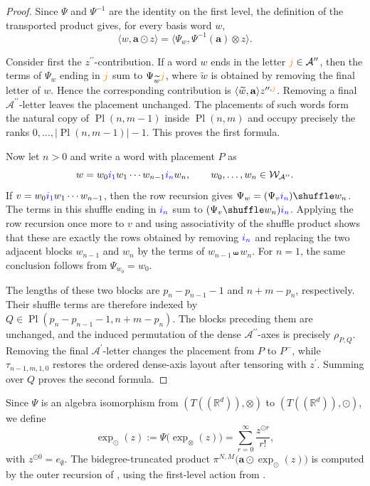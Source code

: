 \documentclass{amsart}
\theoremstyle{definition}
\theoremstyle{remark}
\newcommand{\blue}[1]{{\color{blue}#1}}
\newcommand{\orange}[1]{{\color{orange}#1}}
\begin{document}
\begin{proof}
Since $\Psi$ and $\Psi^{-1}$ are the identity on the first level, the
definition of the transported product gives, for every basis word $w$,
\[
    \big\langle
        w,
        \mathbf{a}\odot z
    \big\rangle
    =
    \big\langle
        \Psi_w,
        \Psi^{-1}(\mathbf{a})\otimes z
    \big\rangle.
\]

Consider first the $z^{\prime\prime}$-contribution. If a word $w$ ends in
the letter $\orange{j}\in\mathcal{A}^{\prime\prime}$, then the terms of
$\Psi_w$ ending in $\orange{j}$ sum to
$\Psi_{\widetilde{w}}\orange{j}$, where $\widetilde{w}$ is obtained by
removing the final letter of $w$. Hence the corresponding contribution is
$\langle\widetilde{w},\mathbf{a}\rangle
z^{\prime\prime,\orange{j}}$. Removing a final
$\mathcal{A}^{\prime\prime}$-letter leaves the placement unchanged. The
placements of such words form the natural copy of
$\operatorname{Pl}(n,m-1)$ inside $\operatorname{Pl}(n,m)$ and occupy
precisely the ranks
$0,\ldots,|\operatorname{Pl}(n,m-1)|-1$. This proves the first formula.

Now let $n>0$ and write a word with placement $P$ as
\[
    w
    =
    w_0\blue{i_1}w_1
    \cdots
    w_{n-1}\blue{i_n}w_n,
    \qquad
    w_0,\ldots,w_n
    \in
    \mathcal{W}_{\mathcal{A}^{\prime\prime}}.
\]
If
$v=w_0\blue{i_1}w_1\cdots
w_{n-1}$, then the row recursion gives
$\Psi_w=(\Psi_v\blue{i_n})\shuffle w_n$. The terms in this shuffle ending
in $\blue{i_n}$ sum to
$(\Psi_v\shuffle w_n)\blue{i_n}$. Applying the row recursion once more to
$v$ and using associativity of the shuffle product shows that these are
exactly the rows obtained by removing $\blue{i_n}$ and replacing the two
adjacent blocks $w_{n-1}$ and $w_n$ by the terms of
$w_{n-1}\shuffle w_n$. For $n=1$, the same conclusion follows from
$\Psi_{w_0}=w_0$.

The lengths of these two blocks are
$p_n-p_{n-1}-1$ and $n+m-p_n$, respectively. Their shuffle terms are
therefore indexed by
$Q\in
\operatorname{Pl}
\left(
    p_n-p_{n-1}-1,
    n+m-p_n
\right)$.
The blocks preceding them are unchanged, and the induced permutation of
the dense $\mathcal{A}^{\prime\prime}$-axes is precisely
$\rho_{P,Q}$. Removing the final
$\mathcal{A}^{\prime}$-letter changes the placement from $P$ to $P^{-}$,
while $\tau_{n-1,m,1,0}$ restores the ordered dense-axis layout after
tensoring with $z^{\prime}$. Summing over $Q$ proves the second formula.
\end{proof}

Since $\Psi$ is an algebra isomorphism from
$(T((\mathbb{R}^d)),\otimes)$ to
$(T((\mathbb{R}^d)),\odot)$, we define
\[
    \exp_{\odot}(z)
    :=
    \Psi\bigl(\exp_{\otimes}(z)\bigr)
    =
    \sum_{r=0}^{\infty}
    \frac{z^{\odot r}}{r!},
\]
with $z^{\odot0}=e_{\emptyset}$. The bidegree-truncated product
$\pi^{N,M}
\bigl(
    \mathbf{a}\odot\exp_{\odot}(z)
\bigr)$
is computed by the outer recursion of
, using the first-level action from
.
\end{document}
